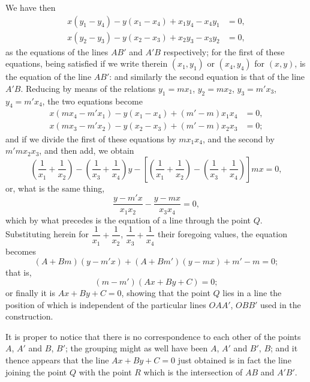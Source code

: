 \documentclass[11pt,a4paper]{article}
\theoremstyle{definition}
\begin{document}
We have then
\begin{align*}
x(y_1-y_4) - y(x_1-x_4) + x_1y_4 - x_4y_1 &= 0,\\
x(y_2-y_3) - y(x_2-x_3) + x_2y_3 - x_3y_2 &= 0,
\end{align*}
as the equations of the lines $AB'$ and $A'B$ respectively; for the first of these equations, being satisfied if we write therein $(x_1,y_1)$ or $(x_4,y_4)$ for $(x,y)$, is the equation of the line $AB'$: and similarly the second equation is that of the line $A'B$. Reducing by means of the relations $y_1=mx_1$, $y_2=mx_2$, $y_3=m'x_3$, $y_4=m'x_4$, the two equations become
\begin{align*}
x(mx_4-m'x_1) - y(x_1-x_4) + (m'-m)x_1x_4 &= 0,\\
x(mx_3-m'x_2) - y(x_2-x_3) + (m'-m)x_2x_3 &= 0;
\end{align*}
and if we divide the first of these equations by $mx_1x_4$, and the second by $m'mx_2x_3$, and then add, we obtain
\[
\left(\frac{1}{x_1}+\frac{1}{x_2}\right) - \left(\frac{1}{x_3}+\frac{1}{x_4}\right) y - \left[\left(\frac{1}{x_1}+\frac{1}{x_2}\right) - \left(\frac{1}{x_3}+\frac{1}{x_4}\right)\right] mx = 0,
\]
or, what is the same thing,
\[
\frac{y-m'x}{x_1x_2} - \frac{y-mx}{x_3x_4} = 0,
\]
which by what precedes is the equation of a line through the point $Q$. Substituting herein for $\dfrac{1}{x_1}+\dfrac{1}{x_2}$, $\dfrac{1}{x_3}+\dfrac{1}{x_4}$ their foregoing values, the equation becomes
\[
(A+Bm)(y-m'x) + (A+Bm')(y-mx) + m'-m = 0;
\]
that is,
\[
(m-m')(Ax+By+C) = 0;
\]
or finally it is $Ax+By+C=0$, showing that the point $Q$ lies in a line the position of which is independent of the particular lines $OAA'$, $OBB'$ used in the construction.

It is proper to notice that there is no correspondence to each other of the points $A$, $A'$ and $B$, $B'$; the grouping might as well have been $A$, $A'$ and $B'$, $B$; and it thence appears that the line $Ax+By+C=0$ just obtained is in fact the line joining the point $Q$ with the point $R$ which is the intersection of $AB$ and $A'B'$.
\end{document}
